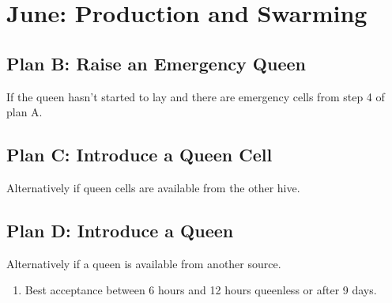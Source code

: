 \section{June: Production and Swarming}

\subsection{Plan B: Raise an Emergency Queen}

If the queen hasn't started to lay and there are emergency cells from step 4 of plan A.

\subsection{Plan C: Introduce a Queen Cell}
 
Alternatively if queen cells are available from the other hive.

\subsection{Plan D: Introduce a Queen}
 
 Alternatively if a queen is available from another source.

\begin{enumerate}
  \item{Best acceptance between 6 hours and 12 hours queenless or after 9 days.}
\end{enumerate}